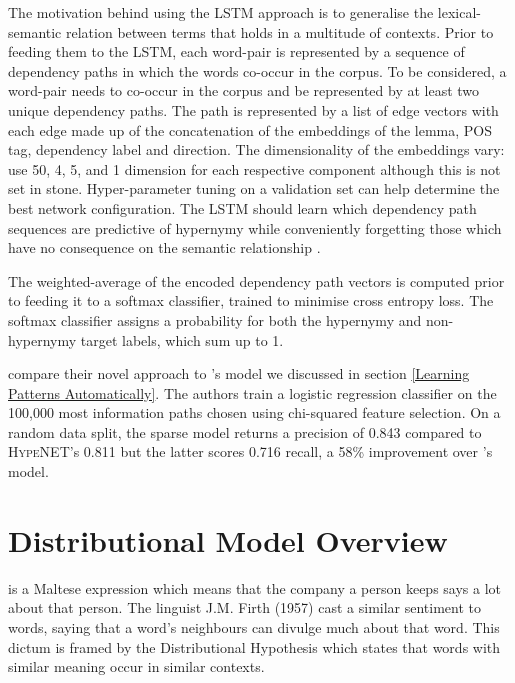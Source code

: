 The motivation behind using the \ac{LSTM} approach is to generalise the lexical-semantic relation between terms that holds in a multitude of contexts.  Prior to feeding them to the \ac{LSTM}, each word-pair is represented by a sequence of dependency paths in which the words co-occur in the corpus.  To be considered, a word-pair needs to co-occur in the corpus and be represented by at least two unique dependency paths.  The path is represented by a list of edge vectors with each edge made up of the concatenation of the embeddings of the lemma, \ac{POS} tag, dependency label and direction.  The dimensionality of the embeddings vary: \citeauthor{shwartz2016path} use 50, 4, 5, and 1 dimension for each respective component \citep{shwartz2016path} although this is not set in stone.  Hyper-parameter tuning on a validation set can help determine the best network configuration.  The \ac{LSTM} should learn which dependency path sequences are predictive of hypernymy while conveniently forgetting those which have no consequence on the semantic relationship \citep{shwartz2016path}.

The weighted-average of the encoded dependency path vectors is computed prior to feeding it to a softmax classifier, trained to minimise cross entropy loss.  The softmax classifier assigns a probability for both the hypernymy and non-hypernymy target labels, which sum up to 1.

\citeauthor{shwartz2016path} compare their novel approach to \citeauthor{Snow2004}'s model \citep{Snow2004} we discussed in section \ref{Learning Patterns Automatically}. The authors train a logistic regression classifier on the 100,000 most information paths chosen using chi-squared feature selection.  On a random data split, the sparse model returns a precision of 0.843 compared to \textsc{HypeNET}’s 0.811 but the latter scores 0.716 recall, a 58\% improvement over \citeauthor{Snow2004}'s model.    

\section{Distributional Model Overview}
 is a Maltese expression which means that the company a person keeps says a lot about that person.  The linguist J.M. Firth (1957) cast a similar sentiment to words, saying that a word’s neighbours can divulge much about that word.  This dictum is framed by the Distributional Hypothesis \citep{harris1954distributional} which states that words with similar meaning occur in similar contexts.  

